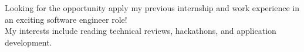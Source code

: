 

\begin{cvparagraph}
Looking for the opportunity apply my previous internship and work experience in an exciting software engineer role!
\\My interests include reading technical reviews, hackathons, and application development.
\end{cvparagraph}
